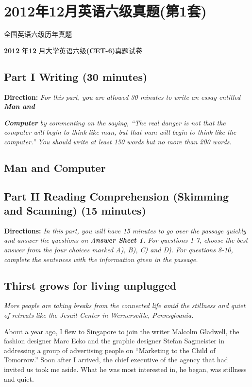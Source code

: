 \documentclass[UTF8,11pt]{ctexart}
\begin{document}
\section*{2012年12月英语六级真题(第1套)}
全国英语六级历年真题


\textbf{2012} 年\textbf{12} 月大学英语六级\textbf{(CET-6)}真题试卷


\subsection*{\textbf{Part I} \textbf{Writing} \textbf{(30 minutes)}}


\textbf{Direction:}\textit{ For this part, you are allowed 30 minutes to write an essay entitled}\textbf{\textit{ Man and}}


\textbf{\textit{Computer}}\textit{ by commenting on the saying, “The real danger is not that the computer will} \textit{begin to think like man, but that man will begin to think like the computer.” You should} \textit{write at least 150 words but no more than 200 words.}


\subsection*{\textbf{Man and Computer}}


\subsection*{\textbf{Part II Reading Comprehension (Skimming and Scanning) (15 minutes)}}


\textbf{Directions:}\textit{ In this part, you will have 15 minutes to go over the passage quickly and answer the} \textit{questions on A}\textbf{\textit{nswer Sheet 1.}}\textit{ For questions 1-7, choose the best answer from the four} \textit{choices marked A), B), C) and D). For questions 8-10, complete the sentences with the} \textit{information given in the passage.}


\subsection*{\textbf{Thirst grows for living unplugged}}


\textit{More people are taking breaks from the connected life amid the stillness and quiet of retreats} \textit{like the Jesuit Center in Wernersville, Pennsylvania.}


About a year ago, I flew to Singapore to join the writer Malcolm Gladwell, the fashion designer Marc Ecko and the graphic designer Stefan Sagmeister in addressing a group of advertising people on “Marketing to the Child of Tomorrow.” Soon after I arrived, the chief executive of the agency that had invited us took me aside. What he was most interested in, he began, was stillness and quiet.
\end{document}
